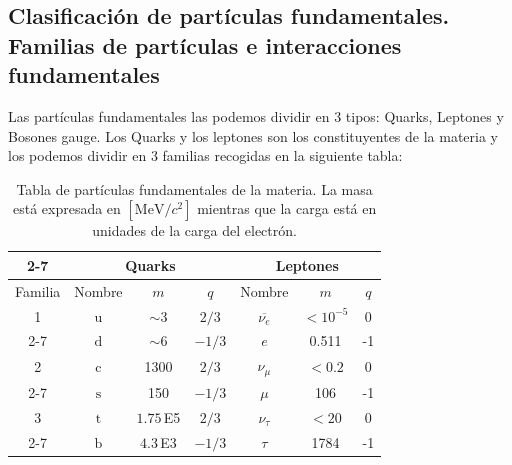 \subsection{Clasificación de partículas fundamentales. Familias de partículas e interacciones fundamentales}
Las partículas fundamentales las podemos dividir en 3 tipos: Quarks, Leptones y Bosones gauge.
Los Quarks y los leptones son los constituyentes de la materia y los podemos dividir en 3 familias recogidas en la siguiente tabla:
\begin{table}[h]
\centering
\begin{tabular}{c|ccc|ccc|}
\cline{2-7}
\textbf{}                     & \multicolumn{3}{c|}{Quarks}                                                              & \multicolumn{3}{c|}{Leptones}                                                               \\ \hline
\multicolumn{1}{|c|}{Familia} & \multicolumn{1}{c|}{Nombre}       & \multicolumn{1}{c|}{$m$} & $q$    & \multicolumn{1}{c|}{Nombre}             & \multicolumn{1}{c|}{$m$} & $q$ \\ \hline
\multicolumn{1}{|c|}{1}       & \multicolumn{1}{c|}{$\mathrm{u}$} & \multicolumn{1}{c|}{$\sim 3$}               & $2/3$  & \multicolumn{1}{c|}{$\overline{\nu_e}$} & \multicolumn{1}{c|}{$<10^{-5}$}             & 0   \\ \cline{2-7} 
\multicolumn{1}{|c|}{}        & \multicolumn{1}{c|}{$\mathrm{d}$} & \multicolumn{1}{c|}{$\sim 6$}               & $-1/3$ & \multicolumn{1}{c|}{$e$}                & \multicolumn{1}{c|}{0.511}                  & -1  \\ \hline
\multicolumn{1}{|c|}{2}       & \multicolumn{1}{c|}{$\mathrm{c}$} & \multicolumn{1}{c|}{1300}                   & $2/3$  & \multicolumn{1}{c|}{$\nu_\mu$}          & \multicolumn{1}{c|}{$<0.2$}                 & 0   \\ \cline{2-7} 
\multicolumn{1}{|c|}{}        & \multicolumn{1}{c|}{$\mathrm{s}$} & \multicolumn{1}{c|}{150}                    & $-1/3$ & \multicolumn{1}{c|}{$\mu$}              & \multicolumn{1}{c|}{106}                    & -1  \\ \hline
\multicolumn{1}{|c|}{3}       & \multicolumn{1}{c|}{$\mathrm{t}$} & \multicolumn{1}{c|}{$1.75\,$E5}             & $2/3$  & \multicolumn{1}{c|}{$\nu_\tau$}         & \multicolumn{1}{c|}{$<20$}                  & 0   \\ \cline{2-7} 
\multicolumn{1}{|c|}{}        & \multicolumn{1}{c|}{$\mathrm{b}$} & \multicolumn{1}{c|}{$4.3\,$E3}                & $-1/3$ & \multicolumn{1}{c|}{$\tau$}             & \multicolumn{1}{c|}{1784}                   & -1  \\ \hline
\end{tabular}
\caption{Tabla de partículas fundamentales de la materia. La masa está expresada en $[\text{MeV}/c^2]$ mientras que la carga está en unidades de la carga del electrón.}
\label{tab: Particulas elementales}
\end{table}

